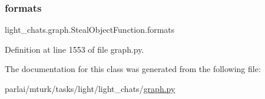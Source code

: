 \subsubsection{\texorpdfstring{formats}{formats}}
{\footnotesize\ttfamily light\+\_\+chats.\+graph.\+Steal\+Object\+Function.\+formats}



Definition at line 1553 of file graph.\+py.



The documentation for this class was generated from the following file\+:\begin{DoxyCompactItemize}
\item 
parlai/mturk/tasks/light/light\+\_\+chats/\hyperlink{parlai_2mturk_2tasks_2light_2light__chats_2graph_8py}{graph.\+py}\end{DoxyCompactItemize}
